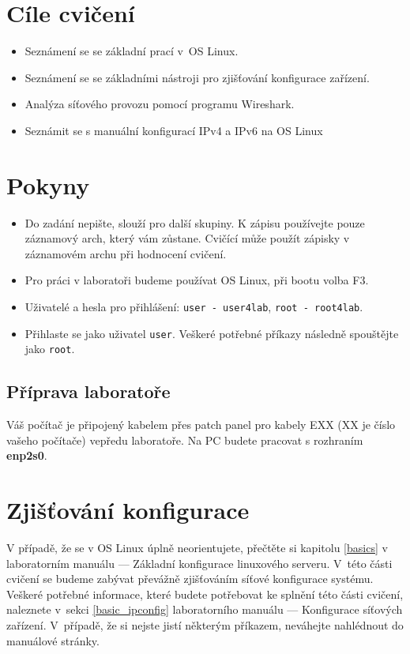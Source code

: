 \section*{Cíle cvičení}
\begin{itemize}
	\item Seznámení se se základní prací v~OS Linux.
	\item Seznámení se se základními nástroji pro zjišťování konfigurace zařízení.
	\item Analýza síťového provozu pomocí programu Wireshark.
	\item Seznámit se s manuální konfigurací IPv4 a IPv6 na OS Linux
\end{itemize}

\section*{Pokyny}
\begin{itemize}
\item Do zadání nepište, slouží pro další skupiny. K zápisu používejte pouze
  záznamový arch, který vám zůstane. Cvičící může použít zápisky v záznamovém
    archu při hodnocení cvičení.
\item Pro práci v laboratoři budeme používat OS Linux, při bootu volba F3.
\item Uživatelé a hesla pro přihlášení: \texttt{user - user4lab}, \texttt{root - root4lab}.
\item Přihlaste se jako uživatel \texttt{user}. Veškeré potřebné příkazy následně spouštějte jako \texttt{root}.
\end{itemize}

\subsection*{Příprava laboratoře}
Váš počítač je připojený kabelem přes patch panel
pro kabely EXX (XX je číslo vašeho počítače) vepředu laboratoře. Na PC budete
pracovat s rozhraním {\bf enp2s0}.

\section{Zjišťování konfigurace}
V případě, že se v OS Linux úplně neorientujete, přečtěte si kapitolu \ref{basics} v
laboratorním manuálu --- Základní konfigurace linuxového serveru. V~této části cvičení se
budeme zabývat převážně zjišťováním síťové konfigurace systému. Veškeré potřebné
informace, které budete potřebovat ke splnění této části cvičení, naleznete
v~sekci \ref{basic_ipconfig} laboratorního manuálu --- Konfigurace síťových zařízení. V~případě, že si nejste jistí některým příkazem, neváhejte nahlédnout do manuálové stránky.

